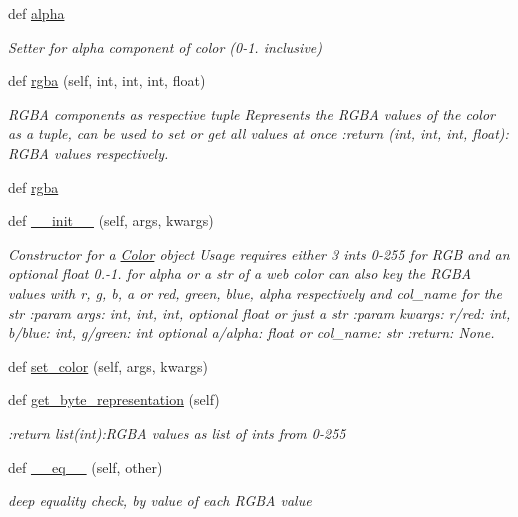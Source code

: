 \begin{DoxyCompactItemize}
def \hyperlink{classbridges_1_1color_1_1_color_ab57c1e881ebb14bccefb870a9fa2ac1d}{alpha}
\begin{DoxyCompactList}\small\item\em Setter for alpha component of color (0-\/1. inclusive) \end{DoxyCompactList}\item 
def \hyperlink{classbridges_1_1color_1_1_color_a7653dfb80aa5ec25ed14314ffa79d1f2}{rgba} (self, int, int, int, float)
\begin{DoxyCompactList}\small\item\em R\+G\+BA components as respective tuple Represents the R\+G\+BA values of the color as a tuple, can be used to set or get all values at once \+:return (int, int, int, float)\+: R\+G\+BA values respectively. \end{DoxyCompactList}\item 
def \hyperlink{classbridges_1_1color_1_1_color_aa3d8dcfea52715f28400b08bf15e94ab}{rgba}
\item 
def \hyperlink{classbridges_1_1color_1_1_color_aacbbede0aceb8f1ca36d78379614bb1a}{\+\_\+\+\_\+init\+\_\+\+\_\+} (self, args, kwargs)
\begin{DoxyCompactList}\small\item\em Constructor for a \hyperlink{classbridges_1_1color_1_1_color}{Color} object Usage requires either 3 ints 0-\/255 for R\+GB and an optional float 0.-\/1. for alpha or a str of a web color can also key the R\+G\+BA values with r, g, b, a or red, green, blue, alpha respectively and col\+\_\+name for the str \+:param args\+: int, int, int, optional float or just a str \+:param kwargs\+: r/red\+: int, b/blue\+: int, g/green\+: int optional a/alpha\+: float or col\+\_\+name\+: str \+:return\+: None. \end{DoxyCompactList}\item 
def \hyperlink{classbridges_1_1color_1_1_color_a99b17a81feb1737f8b29c93ae9ef4bc8}{set\+\_\+color} (self, args, kwargs)
\item 
def \hyperlink{classbridges_1_1color_1_1_color_a30bc8e2023395c584eb256972abc7c1b}{get\+\_\+byte\+\_\+representation} (self)
\begin{DoxyCompactList}\small\item\em \+:return list(int)\+:R\+G\+BA values as list of ints from 0-\/255 \end{DoxyCompactList}\item 
def \hyperlink{classbridges_1_1color_1_1_color_ae5677a0858252f0b33da13866fb62786}{\+\_\+\+\_\+eq\+\_\+\+\_\+} (self, other)
\begin{DoxyCompactList}\small\item\em deep equality check, by value of each R\+G\+BA value \end{DoxyCompactList}\end{DoxyCompactItemize}
